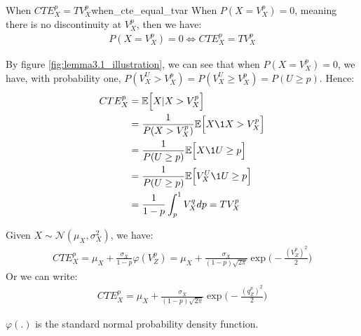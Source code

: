 \begin{proposition}{When $CTE_X^p=TV_X^p$}{when_cte_equal_tvar}
    When $P(X=V_X^p)=0$, meaning there is no discontinuity at $V_X^p$, then we have:
    \begin{align*}
        P(X=V_X^p)=0 \iff CTE_X^p = TV_X^p
    \end{align*}
\end{proposition}

\begin{proof*}
    By figure \ref{fig:lemma3.1_illustration}, we can see that when $P(X=V_X^p)=0$, we have, with probability one, $P(V_X^U > V_X^p) = P(V_X^U \ge V_X^p) = P(U \ge p)$. Hence:
    \begin{align*}
        CTE_X^p &= \mathbb{E}\Big[ X | X > V_X^p\Big] \\
        &= \frac{1}{P(X>V_X^p)}\mathbb{E}\Big[ X\1{X > V_X^p} \Big] \\
        &= \frac{1}{P(U \ge p)}\mathbb{E}\Big[ X\1{U \ge p} \Big] \\
        &= \frac{1}{P(U \ge p)}\mathbb{E}\Big[ V_X^U\1{U \ge p} \Big] \\
        &= \frac{1}{1-p} \int_p^1 V_X^qdp = TV_X^p
    \end{align*}
\end{proof*}

\begin{definition}
    Given $X\sim \mathcal{N}(\mu_X, \sigma_X^2)$, we have:
    \begin{align*}
        \boxed{
        CTE_X^p = \mu_X + \frac{\sigma_X}{1-p}\varphi(V_Z^p) = \mu_X + \frac{\sigma_X}{(1-p)\sqrt{2\pi}}\exp\Bigg( -\frac{(V_Z^p)^2}{2} \Bigg)
        }
    \end{align*}
    \noindent Or we can write:
    \begin{align*}
        CTE_X^p = \mu_X + \frac{\sigma_X}{(1-p)\sqrt{2\pi}}\exp\Bigg( -\frac{(q_Z^p)^2}{2} \Bigg)
    \end{align*}

    \noindent $\varphi(.)$ is the standard normal probability density function.
\end{definition}

